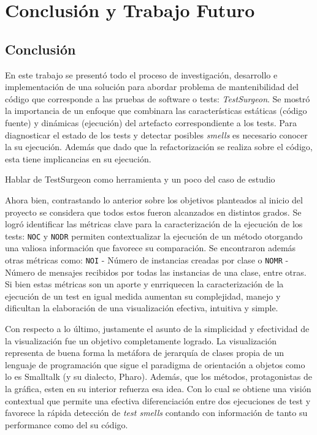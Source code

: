 \chapter{Conclusión y Trabajo Futuro}

\section{Conclusión}

\par En este trabajo se presentó todo el proceso de investigación, desarrollo e implementación de una solución para abordar problema de mantenibilidad del código que corresponde a las pruebas de software o tests: \emph{TestSurgeon}. Se mostró la importancia de un enfoque que combinara las características estáticas (código fuente) y dinámicas (ejecución) del artefacto correspondiente a los tests. Para diagnosticar el estado de los tests y detectar posibles \emph{smells} es necesario conocer la su ejecución. Además que dado que la refactorización se realiza sobre el código, esta tiene implicancias en su ejecución.

\par Hablar de TestSurgeon como herramienta y un poco del caso de estudio


\par Ahora bien, contrastando lo anterior sobre los objetivos planteados al inicio del proyecto se considera que todos estos fueron alcanzados en distintos grados. Se logró identificar las métricas clave para la caracterización de la ejecución de los tests: {\tt NOC} y {\tt NODR} permiten contextualizar la ejecución de un método otorgando una valiosa información que favorece su comparación. Se encontraron además otras métricas como: {\tt NOI} - Número de instancias creadas por clase o {\tt NOMR} - Número de mensajes recibidos por todas las instancias de una clase, entre otras. Si bien estas métricas son un aporte y enrriquecen la caracterización de la ejecución de un test en igual medida aumentan su complejidad, manejo y dificultan la elaboración de una visualización efectiva, intuitiva y simple. 

\par Con respecto a lo último, justamente el asunto de la simplicidad y efectividad de la visualización fue un objetivo completamente logrado. La visualización representa de buena forma la metáfora de jerarquía de clases propia de un lenguaje de programación que sigue el paradigma de orientación a objetos como lo es Smalltalk (y su dialecto, Pharo). Además, que los métodos, protagonistas de la gráfica, esten en su interior refuerza esa idea. Con lo cual se obtiene una visión contextual que permite una efectiva diferenciación entre dos ejecuciones de test y favorece la rápida detección de \emph{test smells} contando con información de tanto su performance como del su código.

